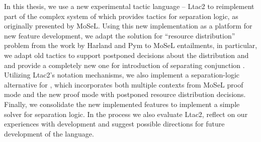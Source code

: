 In this thesis, we use a new experimental tactic language -- Ltac2 to reimplement part of the complex system of which provides tactics for separation logic, as originally presented by MoSeL.
Using this new implementation as a platform for new feature development, we adapt the solution for ``resource distribution'' problem from the work by Harland and Pym to MoSeL entailments, in particular, we adapt old tactics to support postponed decisions about the distribution and and provide a completely new one for introduction of separating conjunction .
Utilizing Ltac2's notation mechanisms, we also implement a separation-logic alternative for , which incorporates both multiple contexts from MoSeL proof mode and the new proof mode with postponed resource distribution decisions.
Finally, we consolidate the new implemented features to implement a simple solver for separation logic.
In the process we also evaluate Ltac2, reflect on our experiences with development and suggest possible directions for future development of the language.

